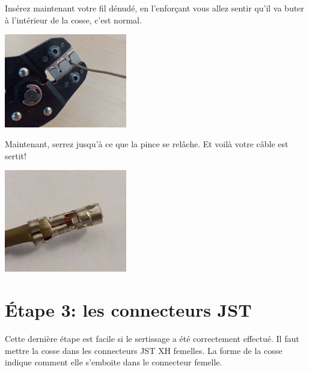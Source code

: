 \documentclass{article}
\begin{document}
Insérez maintenant votre fil dénudé, en l'enforçant vous allez sentir qu'il va buter à l'intérieur de la cosse, c'est normal. 

\begin{minipage}{\textwidth}
    \vspace{0.5cm}
    \begin{center}
    \includegraphics[width=0.4\textwidth]{images/sertissage_fil.jpg}
    \captionsetup{labelformat=empty}
    \end{center}
    \vspace{0.5cm}
\end{minipage}

Maintenant, serrez jusqu'à ce que la pince se relâche. Et voilà votre câble est sertit!

\begin{minipage}{\textwidth}
    \vspace{0.5cm}
    \begin{center}
    \includegraphics[width=0.4\textwidth]{images/sertissage_finit.jpg}
    \captionsetup{labelformat=empty}
    \end{center}
    \vspace{0.5cm}
\end{minipage}

\section*{Étape 3: les connecteurs JST}

Cette dernière étape est facile si le sertissage a été correctement effectué. Il faut mettre la cosse dans les connecteurs JST XH femelles. La forme de la cosse indique comment elle s'emboite dans le connecteur femelle.
\end{document}
